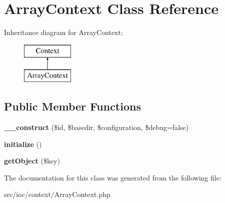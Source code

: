 \hypertarget{class_array_context}{\section{Array\-Context Class Reference}
\label{class_array_context}
}
Inheritance diagram for Array\-Context\-:\begin{figure}[H]
\begin{center}
\leavevmode
\includegraphics[height=2.000000cm]{class_array_context}
\end{center}
\end{figure}
\subsection*{Public Member Functions}
\begin{DoxyCompactItemize}
\item 
\hypertarget{class_array_context_a69598be2d320c0bccf5fd7d7dea1f4db}{{\bfseries \-\_\-\-\_\-construct} (\$id, \$basedir, \$configuration, \$debug=false)}\label{class_array_context_a69598be2d320c0bccf5fd7d7dea1f4db}

\item 
\hypertarget{class_array_context_a91098fa7d1917ce4833f284bbef12627}{{\bfseries initialize} ()}\label{class_array_context_a91098fa7d1917ce4833f284bbef12627}

\item 
\hypertarget{class_array_context_a09620fce23d46253525756869a03d51f}{{\bfseries get\-Object} (\$key)}\label{class_array_context_a09620fce23d46253525756869a03d51f}

\end{DoxyCompactItemize}


The documentation for this class was generated from the following file\-:\begin{DoxyCompactItemize}
\item 
src/ioc/context/Array\-Context.\-php\end{DoxyCompactItemize}
